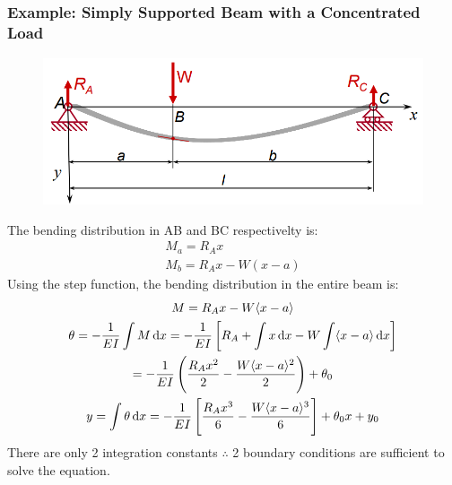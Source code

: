 \documentclass[class=report, crop=false, 12pt,a4paper]{standalone}
\begin{document}
\subsubsection{Example: Simply Supported Beam with a Concentrated Load}
\begin{figure}[H]
  \centering
  \includegraphics[width = 0.75 \textwidth]{../img/beam6.PNG}
\end{figure}
The bending distribution in AB and BC respectivelty is:
\begin{gather}
  M_a = R_Ax \\
  M_b = R_Ax - W(x-a)
\end{gather}
Using the step function, the bending distribution in the entire beam is:
\begin{gather}
  M = R_Ax - W\langle x-a \rangle \\
  \theta = -\frac{1}{EI}\int M \dif x = -\frac{1}{EI}\left[R_A+\int x \dif x - W\int \langle x-a \rangle \dif x \right] \\
  = -\frac{1}{EI}\left(\frac{R_Ax^2}{2}-\frac{W\langle x-a \rangle^2}{2}\right) + \theta_0 \\
  y = \int \theta \dif x = -\frac{1}{EI}\left[\frac{R_Ax^3}{6}-\frac{W\langle x-a \rangle^3}{6}\right] + \theta_0x + y_0
\end{gather}
There are only 2 integration constants $\therefore$ 2 boundary conditions are sufficient to solve the equation.
\end{document}
